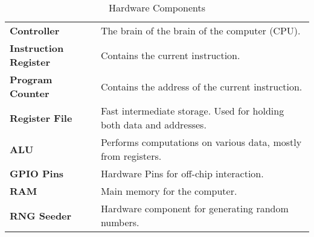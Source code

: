 \newcommand{\hw}[2]{%
	\textbf{#1} & #2 \\%
	\hline%
}
\begin{table}[H]
	\begin{tabularx}{\textwidth}{| a | x |}
		\hline
		 &  \\
		\hline
		\hw{Controller}{The brain of the brain of the computer (CPU).}
		\hw{Instruction Register}{Contains the current instruction.}
		\hw{Program Counter}{Contains the address of the current instruction.}
		\hw{Register File}{Fast intermediate storage. Used for holding both data and addresses.}
		\hw{ALU}{Performs computations on various data, mostly from registers.}
		\hw{GPIO Pins}{Hardware Pins for off-chip interaction.}
		\hw{RAM}{Main memory for the computer.}
		\hw{RNG Seeder}{Hardware component for generating random numbers.}
	\end{tabularx}
	\label{Tab:hardware}
	\caption{Hardware Components}
\end{table}

